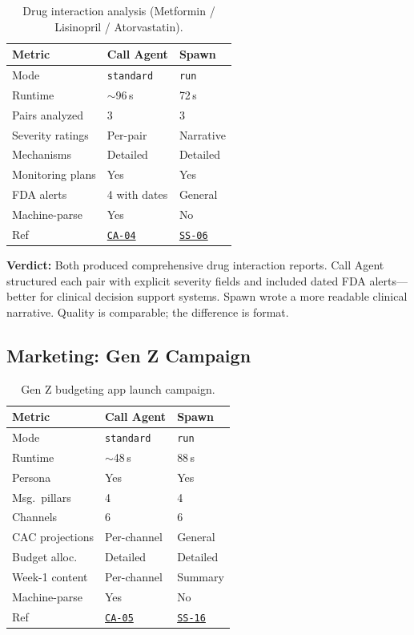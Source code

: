 \documentclass[11pt,twocolumn]{article}
\newcommand{\win}[1]{\cellcolor{winner}#1}
\newcommand{\lose}[1]{\cellcolor{loser}#1}
\newcommand{\tie}[1]{\cellcolor{tied}#1}
\newcommand{\ghbase}{https://github.com/agenticmail/agenticmail/blob/main/research/agent-rpc-vs-spawn}
\begin{document}
\begin{table}[H]
\centering
\caption{Drug interaction analysis (Metformin / Lisinopril / Atorvastatin).}
\begin{tabular}{@{}p{2.2cm}p{2.1cm}p{2.1cm}@{}}
\toprule
\textbf{Metric} & \textbf{Call Agent} & \textbf{Spawn} \\
\midrule
Mode & \texttt{standard} & \texttt{run} \\
Runtime & \lose{$\sim$96\,s} & \win{72\,s} \\
Pairs analyzed & \tie{3} & \tie{3} \\
Severity ratings & \win{Per-pair} & Narrative \\
Mechanisms & \tie{Detailed} & \tie{Detailed} \\
Monitoring plans & \tie{Yes} & \tie{Yes} \\
FDA alerts & \win{4 with dates} & General \\
Machine-parse & \win{Yes} & \lose{No} \\
Ref & \href{\ghbase/results-callagent/04-healthcare-drugs-standard.md}{\texttt{CA-04}} & \href{\ghbase/results/06-healthcare-drugs.md}{\texttt{SS-06}} \\
\bottomrule
\end{tabular}
\end{table}

\textbf{Verdict:} Both produced comprehensive drug interaction reports. Call Agent structured each pair with explicit severity fields and included dated FDA alerts---better for clinical decision support systems. Spawn wrote a more readable clinical narrative. Quality is comparable; the difference is format.

\subsection{Marketing: Gen Z Campaign}

\begin{table}[H]
\centering
\caption{Gen Z budgeting app launch campaign.}
\begin{tabular}{@{}p{2.2cm}p{2.1cm}p{2.1cm}@{}}
\toprule
\textbf{Metric} & \textbf{Call Agent} & \textbf{Spawn} \\
\midrule
Mode & \texttt{standard} & \texttt{run} \\
Runtime & \win{$\sim$48\,s} & \lose{88\,s} \\
Persona & \tie{Yes} & \tie{Yes} \\
Msg.\ pillars & \tie{4} & \tie{4} \\
Channels & \tie{6} & \tie{6} \\
CAC projections & \win{Per-channel} & General \\
Budget alloc. & \tie{Detailed} & \tie{Detailed} \\
Week-1 content & \win{Per-channel} & Summary \\
Machine-parse & \win{Yes} & \lose{No} \\
Ref & \href{\ghbase/results-callagent/05-marketing-campaign-standard.md}{\texttt{CA-05}} & \href{\ghbase/results/16-marketing-campaign.md}{\texttt{SS-16}} \\
\bottomrule
\end{tabular}
\end{table}
\end{document}
